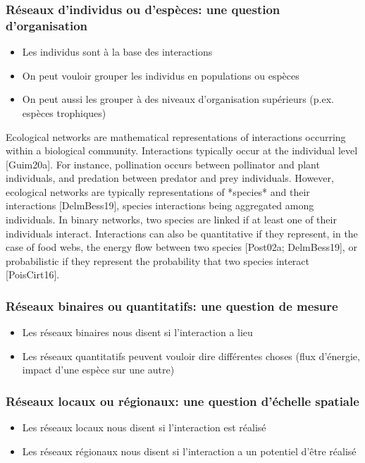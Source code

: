 \subsubsection{Réseaux d'individus ou d'espèces: une question d'organisation} 

\begin{itemize}
    \item Les individus sont à la base des interactions
    \item On peut vouloir grouper les individus en populations ou espèces
    \item On peut aussi les grouper à des niveaux d'organisation supérieurs (p.ex. espèces trophiques)
\end{itemize}

Ecological networks are mathematical representations of interactions occurring
within a biological community. Interactions typically occur at the individual
level [Guim20a]. For instance, pollination occurs between pollinator and plant
individuals, and predation between predator and prey individuals. However,
ecological networks are typically representations of *species* and their
interactions [DelmBess19], species interactions being aggregated among
individuals. In binary networks, two species are linked if at least one of their
individuals interact. Interactions can also be quantitative if they represent,
in the case of food webs, the energy flow between two species [Post02a;
DelmBess19], or probabilistic if they represent the probability that two
species interact [PoisCirt16].

\subsubsection{Réseaux binaires ou quantitatifs: une question de mesure} 

\begin{itemize}
    \item Les réseaux binaires nous disent si l'interaction a lieu
    \item Les réseaux quantitatifs peuvent vouloir dire différentes choses (flux d'énergie, impact d'une espèce sur une autre)
\end{itemize}

\subsubsection{Réseaux locaux ou régionaux: une question d'échelle spatiale} 

\begin{itemize}
    \item Les réseaux locaux nous disent si l'interaction est réalisé 
    \item Les réseaux régionaux nous disent si l'interaction a un potentiel d'être réalisé
\end{itemize}

